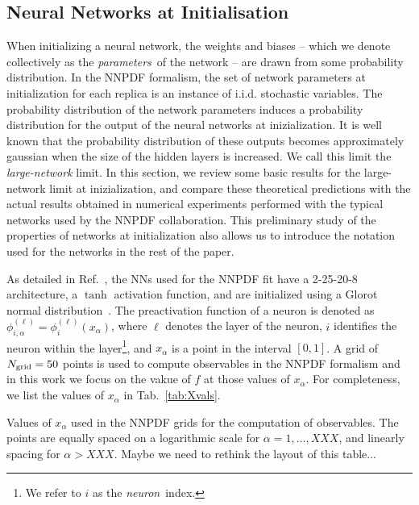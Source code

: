 \subsection{Neural Networks at Initialisation}

When initializing a neural network, the weights and biases -- which we denote collectively as the {\em parameters}\ 
of the network -- are drawn from some probability distribution. In 
the NNPDF formalism, the set of network parameters at initialization for each replica is an instance 
of i.i.d. stochastic variables. The probability distribution
of the network parameters induces a probability distribution for the output of the neural networks at inizialization. 
It is well known that the probability distribution of these outputs becomes approximately gaussian when the size of
the hidden layers is increased. We call this limit the {\em large-network} limit. 
In this section, we review some basic results for the large-network limit at inizialization, and 
compare these theoretical 
predictions with the actual results obtained in numerical experiments performed with the typical networks 
used by the NNPDF collaboration. 
This preliminary study of the properties of networks at initialization also allows us to introduce the 
notation used for the networks in the rest of the paper. 

As detailed in Ref.~\cite{NNPDF:2021njg}, the NNs used for the NNPDF fit have a 2-25-20-8 architecture,
a $\tanh$ activation function,
and are initialized using a Glorot normal distribution~\cite{glorot2010understanding}. The preactivation
function of a neuron is denoted as $\phi^{(\ell)}_{i,\alpha} = \phi^{(\ell)}_i(x_\alpha)$, where $\ell$
denotes the layer of the neuron, $i$ identifies the neuron within the layer\footnote{We refer
to $i$ as the {\em neuron}\ index.}, and $x_{\alpha}$ is a point in the interval $[0,1]$.
A grid of $N_{\mathrm{grid}}=50$ points is used to compute observables in the NNPDF formalism and in this work 
we focus on the vakue of $f$ at those values of $x_\alpha$. For completeness, we list the values of $x_\alpha$ in
Tab.~\ref{tab:Xvals}.

\begin{table}[ht]
    \centering
    
    \caption{Values of $x_\alpha$ used in the NNPDF grids for the computation of
    observables. The points are equally spaced on a logarithmic scale
    for $\alpha = 1, \ldots, XXX$, and linearly spacing for $\alpha > XXX$.
    \ac{Maybe we need to rethink the layout of this table...}
    \label{tab:Xvals}}
\end{table}

